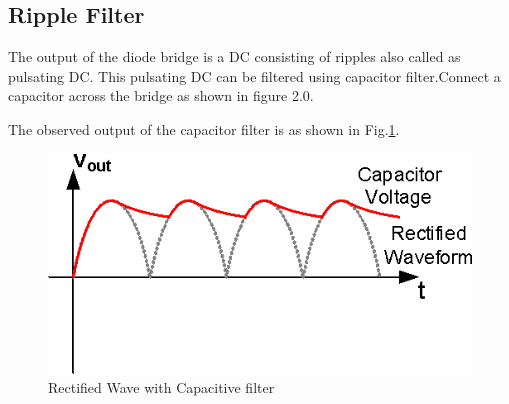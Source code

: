 \documentclass[journal,12pt,twocolumn]{IEEEtran}
\begin{document}
\subsection{Ripple Filter}
\begin{problem}
The output of the diode bridge is a DC consisting of ripples also called as pulsating DC. This pulsating DC can be filtered using  capacitor filter.Connect a capacitor across the bridge as shown in figure 2.0. 
\end{problem}
\begin{problem}
The observed output of the capacitor filter is as shown in Fig.\ref{fig3}.
\end{problem}

\begin{figure}[h]
\centering
	\includegraphics[scale=0.4]{./figs/cap.png}
	\caption{Rectified Wave with Capacitive filter}  \label{fig3}
    \end{figure}
\end{document}
